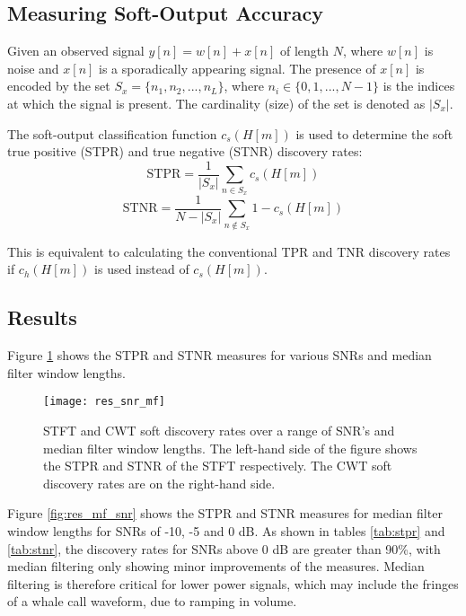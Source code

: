 \subsection{Measuring Soft-Output Accuracy}

Given an observed signal $y[n] = w[n] + x[n]$ of length $N$, where $w[n]$ is noise and $x[n]$ is a sporadically appearing signal. The presence of $x[n]$ is encoded by the set $S_x = \{ {n_1, n_2, ..., n_L} \}$, where $n_i \in \{0, 1, ..., N -1\}$ is the indices at which the signal is present. The cardinality (size) of the set is denoted as $|S_x|$.

The soft-output classification function $c_s(H[m])$ is used to determine the soft true positive (STPR) and true negative (STNR) discovery rates:
\begin{equation*}
	\text{STPR} = \frac{1}{|S_x|} \sum_{n \in S_x} c_s(H[m])
\end{equation*}
\begin{equation*}
	\text{STNR} = \frac{1}{N - |S_x|} \sum_{n \notin S_x} 1 - c_s(H[m])
\end{equation*}

This is equivalent to calculating the conventional TPR and TNR discovery rates if $c_h(H[m])$ is used instead of $c_s(H[m])$.
 
 \subsection{Results}
 \label{sec:fmsweep} 

Figure \ref{fig:res_snr_mf} shows the STPR and STNR measures for various SNRs and median filter window lengths.
 
 \begin{figure}[h!]
 	\centering
 	\texttt{[image: res\_snr\_mf]}
 	\caption{STFT and CWT soft discovery rates over a range of SNR's and median filter window lengths. The left-hand side of the figure shows the STPR and STNR of the STFT respectively. The CWT soft discovery rates are on the right-hand side.}
 	\label{fig:res_snr_mf}
 \end{figure}


Figure \ref{fig:res_mf_snr} shows the STPR and STNR measures for median filter window lengths for SNRs of -10, -5 and 0 dB. As shown in tables \ref{tab:stpr} and \ref{tab:stnr}, the discovery rates for SNRs above 0 dB are greater than 90\%, with median filtering only showing minor improvements of the measures. Median filtering is therefore critical for lower power signals, which may include the fringes of a whale call waveform, due to ramping in volume.

